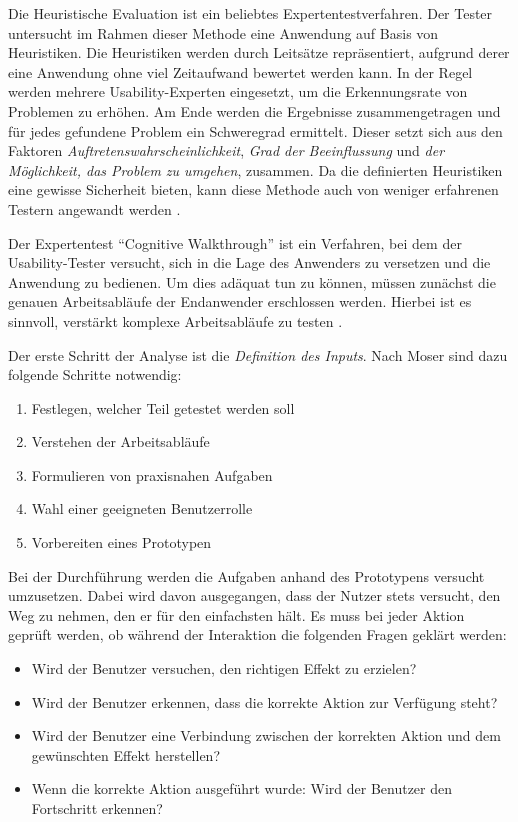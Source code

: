 Die Heuristische Evaluation ist ein beliebtes Expertentestverfahren. Der Tester untersucht im Rahmen dieser Methode eine Anwendung auf Basis von Heuristiken. Die Heuristiken werden durch Leitsätze repräsentiert, aufgrund derer eine Anwendung ohne viel Zeitaufwand bewertet werden kann. In der Regel werden mehrere Usability-Experten eingesetzt, um die Erkennungsrate von Problemen zu erhöhen. Am Ende werden die Ergebnisse zusammengetragen und für jedes gefundene Problem ein Schweregrad ermittelt. Dieser setzt sich aus den Faktoren \textit{Auftretenswahrscheinlichkeit}, \textit{Grad der Beeinflussung} und \textit{der Möglichkeit, das Problem zu umgehen}, zusammen. Da die definierten Heuristiken eine gewisse Sicherheit bieten, kann diese Methode auch von weniger erfahrenen Testern angewandt werden \cite[S. 232f.]{Moser2012}.\par
{}
Der Expertentest \enquote{Cognitive Walkthrough} ist ein Verfahren, bei dem der Usability-Tester versucht, sich in die Lage des Anwenders zu versetzen und die Anwendung zu bedienen. Um dies adäquat tun zu können, müssen zunächst die genauen Arbeitsabläufe der Endanwender erschlossen werden. Hierbei ist es sinnvoll, verstärkt komplexe Arbeitsabläufe zu testen \cite[S. 234]{Moser2012}.\par
Der erste Schritt der Analyse ist die \textit{Definition des Inputs}. Nach Moser sind dazu folgende Schritte notwendig:
\begin{enumerate}
	\item Festlegen, welcher Teil getestet werden soll
	\item Verstehen der Arbeitsabläufe
	\item Formulieren von praxisnahen Aufgaben
	\item Wahl einer geeigneten Benutzerrolle
	\item Vorbereiten eines Prototypen \cite[S. 234]{Moser2012}
\end{enumerate}
Bei der Durchführung werden die Aufgaben anhand des Prototypens versucht umzusetzen. Dabei wird davon ausgegangen, dass der Nutzer stets versucht, den Weg zu nehmen, den er für den einfachsten hält. Es muss bei jeder Aktion geprüft werden, ob während der Interaktion die folgenden Fragen geklärt werden:
\begin{itemize}
	\item Wird der Benutzer versuchen, den richtigen Effekt zu erzielen?
	\item Wird der Benutzer erkennen, dass die korrekte Aktion zur Verfügung steht?
	\item Wird der Benutzer eine Verbindung zwischen der korrekten Aktion und dem gewünschten Effekt herstellen?
	\item Wenn die korrekte Aktion ausgeführt wurde: Wird der Benutzer den Fortschritt erkennen? \cite[S. 234]{Moser2012}
\end{itemize}
